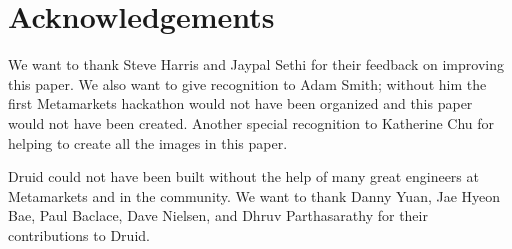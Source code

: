 \documentclass{vldb}
\begin{document}
\balance

\section{Acknowledgements}
\label{sec:acknowledgements}
We want to thank Steve Harris and Jaypal Sethi for their feedback on improving this paper.
We also want to give recognition to Adam Smith; without him the first Metamarkets hackathon would not have
been organized and this paper would not have been created. Another special recognition to Katherine Chu for
helping to create all the images in this paper.

Druid could not have been built without the help of many great
engineers at Metamarkets and in the community. We want to thank Danny Yuan, Jae Hyeon Bae, Paul Baclace, Dave
Nielsen, and Dhruv Parthasarathy for their
contributions to Druid.




\end{document}
